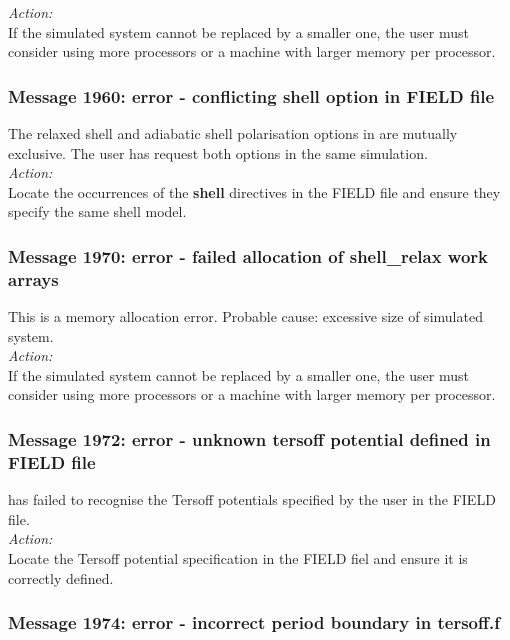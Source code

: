 \noindent
{\em Action:}\\
If the simulated system cannot be replaced by a smaller one, the user
must consider using more processors or a machine with larger memory
per processor.\\

\subsubsection*{Message 1960: error - conflicting shell option in
FIELD file}

The relaxed shell and adiabatic shell polarisation options in \D{} are
mutually exclusive. The user has request both options in the same simulation.
\\
\noindent
{\em Action:} \\
Locate the occurrences of the {\bf shell} directives in the FIELD file
and ensure they specify the same shell model.
\\

\subsubsection*{Message 1970: error - failed allocation of shell\_relax
work arrays}

This is a memory allocation error. Probable cause: excessive size of
simulated system. \\

\noindent
{\em Action:}\\
If the simulated system cannot be replaced by a smaller one, the user
must consider using more processors or a machine with larger memory
per processor.\\

\subsubsection*{Message 1972: error - unknown tersoff potential
defined in FIELD file}

\D{} has failed to recognise the Tersoff
potentials  specified by the user in the FIELD
file. \\

\noindent
{\em Action:} \\
Locate the Tersoff potential specification in the FIELD fiel and
ensure it is correctly defined. \\

\subsubsection*{Message 1974: error - incorrect period boundary in
tersoff.f}

